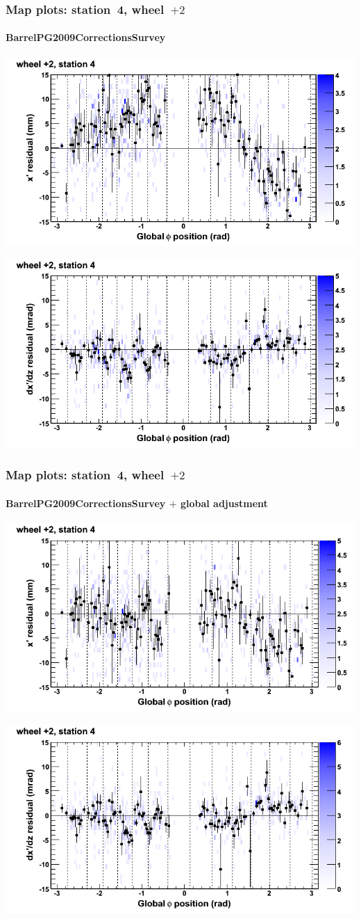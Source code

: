 \documentclass[compress]{beamer}
\begin{document}
\begin{frame}
\frametitle{Map plots: station~4, wheel~$+2$}
\framesubtitle{BarrelPG2009CorrectionsSurvey}
\includegraphics[width=0.5\linewidth]{mapplots_01/DTvsphi_st4whE_x.png}

\includegraphics[width=0.5\linewidth]{mapplots_01/DTvsphi_st4whE_dxdz.png}
\end{frame}
\begin{frame}
\frametitle{Map plots: station~4, wheel~$+2$}
\framesubtitle{BarrelPG2009CorrectionsSurvey $+$ global adjustment}
\includegraphics[width=0.5\linewidth]{mapplots_re01/DTvsphi_st4whE_x.png}

\includegraphics[width=0.5\linewidth]{mapplots_re01/DTvsphi_st4whE_dxdz.png}
\end{frame}
\end{document}
